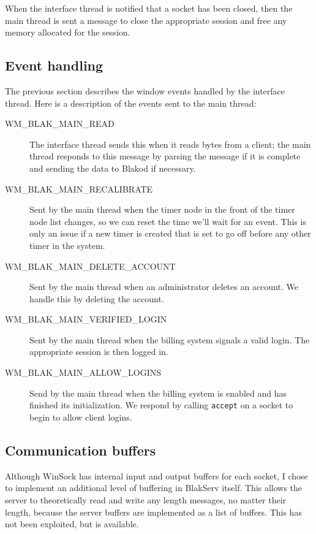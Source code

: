 When the interface thread is notified that a socket has been closed,
then the main thread is sent a message to close the appropriate
session and free any memory allocated for the session.

\subsection{Event handling}

The previous section describes the window events handled by the interface
thread.  Here is a description of the events sent to the main thread:

\begin{description}
\item[WM\_BLAK\_MAIN\_READ] The interface thread sends this when it reads
bytes from a client; the main thread responds to this message by parsing
the message if it is complete and sending the data to Blakod if necessary.

\item[WM\_BLAK\_MAIN\_RECALIBRATE] Sent by the main thread when the timer
node in the front of the timer node list changes, so we can reset the
time we'll wait for an event.  This is only an issue if a new timer is 
created that is set to go off before any other timer in the system.

\item[WM\_BLAK\_MAIN\_DELETE\_ACCOUNT] Sent by the main thread when an
administrator deletes an account.  We handle this by deleting the account.

\item[WM\_BLAK\_MAIN\_VERIFIED\_LOGIN] Sent by the main thread when
the billing system signals a valid login.  The appropriate session is then logged in.

\item[WM\_BLAK\_MAIN\_ALLOW\_LOGINS] Send by the main thread when
the billing system is enabled and has finished its initialization.  We respond
by calling \texttt{accept} on a socket to begin to allow client logins.

\end{description}

\subsection{Communication buffers}

Although WinSock has internal input and output buffers for each socket, I
chose to implement an additional level of buffering in BlakServ itself.  This allows
the server to theoretically read and write any length messages, no matter their
length, because the server buffers are implemented as a list of buffers.  This
has not been exploited, but is available.

